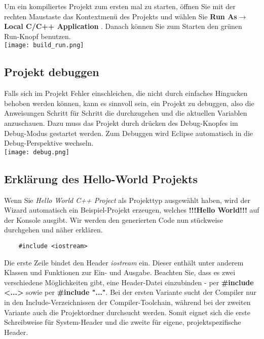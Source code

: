 \documentclass[
  accentcolor=tud1c,	%
  colorbacktitle,		%
  inverttitle,			%
  german,				%
  twoside
]{tudexercise}
\begin{document}
Um ein kompiliertes Projekt zum ersten mal zu starten, öffnen Sie mit der rechten Maustaste das Kontextmenü des Projekts und wählen Sie \textbf{Run As$\rightarrow$ Local C/C++ Application }.
Danach können Sie zum Starten den grünen Run-Knopf benutzen. \\

\texttt{[image: build\_run.png]}

\subsection{Projekt debuggen}
Falls sich im Projekt Fehler einschleichen, die nicht durch einfaches Hingucken behoben werden können, kann es sinnvoll sein, ein Projekt zu debuggen, also die Anweisungen Schritt für Schritt die durchzugehen und die aktuellen Variablen anzuschauen. Dazu muss das Projekt durch drücken des Debug-Knopfes im Debug-Modus gestartet werden. Zum Debuggen wird Eclipse automatisch in die Debug-Perspektive wechseln. \\

\texttt{[image: debug.png]}

\subsection{Erklärung des Hello-World Projekts}
Wenn Sie \textit{Hello World C++ Project} als Projekttyp ausgewählt haben, wird der Wizard automatisch ein Beispiel-Projekt erzeugen, welches \textbf{!!!Hello World!!!} auf der Konsole ausgibt. Wir werden den generierten Code nun stückweise durchgehen und näher erklären.  \\

\begin{lstlisting}
	#include <iostream>
\end{lstlisting}

Die erste Zeile bindet den Header \emph{iostream} ein. Dieser
enthält unter anderem Klassen und Funktionen zur Ein- und Ausgabe. Beachten Sie, dass es zwei verschiedene Möglichkeiten gibt, eine Header-Datei einzubinden -  per \textbf{\#include <...>} sowie per \textbf{\#include "..."}. Bei der ersten Variante sucht der Compiler nur in den Include-Verzeichnissen der Compiler-Toolchain, während bei der zweiten Variante auch die Projektordner durchsucht werden. Somit eignet sich die erste Schreibweise für System-Header und die zweite für eigene, projektspezifische Header. \\
\end{document}

